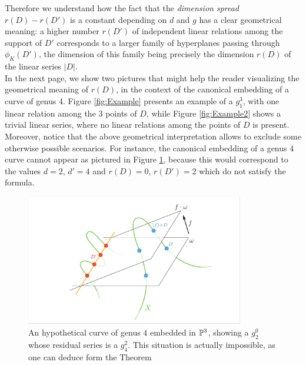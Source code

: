 	Therefore we understand how the fact that the \emph{dimension spread} $r(D)-r(D')$ is a constant depending on $d$ and $g$ has a clear geometrical meaning: a higher number $r(D')$ of independent linear relations among the support of $D'$ corresponds to a larger family of hyperplanes passing through $\phi_K(D')$, the dimension of this family being precisely the dimension $r(D)$ of the linear series $|D|$.\\  

	In the next page, we show two pictures that might help the reader visualizing the geometrical meaning of $r(D)$, in the context of the canonical embedding of a curve of genus $4$. Figure \ref{fig:Example} presents an example of a $g_1^3$, with one linear relation among the $3$ points of $D$, while Figure \ref{fig:Example2} shows a trivial linear series, where no linear relations among the points of $D$ is present.\\

	Moreover, notice that the above geometrical interpretation allows to exclude some otherwise possible scenarios. For instance, the canonical embedding of a genus $4$ curve cannot appear as pictured in Figure \ref{fig:Impossible}, because this would correspond to the values $d=2$, $d'=4$ and $r(D)=0$, $r(D')=2$ which do not satisfy the \RR formula.
	\vspace{1.5em}
	\begin{figure}[H]
		\centering
		\includegraphics[width=0.85\textwidth]{Impossible.pdf}
		\caption{An hypothetical curve of genus $4$ embedded in $\mathbb{P}^3$, showing a $g_2^0$ whose residual series is a $g_4^2$. This situation is actually impossible, as one can deduce form the \RR Theorem }
		\label{fig:Impossible}
	\end{figure}


